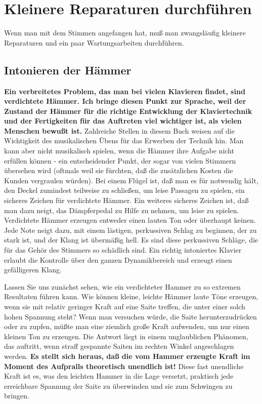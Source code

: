 
\chapter{Kleinere Reparaturen durchführen}
\label{c2_7}

Wenn man mit dem Stimmen angefangen hat, muß man zwangsläufig kleinere Reparaturen und ein paar Wartungsarbeiten durchführen.
 

\hypertarget{c2_7a}{}
\section{Intonieren der Hämmer}
\label{c2_7_hamm}

\textbf{Ein verbreitetes Problem, das man bei vielen Klavieren findet, sind verdichtete Hämmer.
Ich bringe diesen Punkt zur Sprache, weil der Zustand der Hämmer für die richtige Entwicklung der Klaviertechnik und der Fertigkeiten für das Auftreten viel wichtiger ist, als vielen Menschen bewußt ist.}
Zahlreiche Stellen in diesem Buch weisen auf die Wichtigkeit des musikalischen Übens für das Erwerben der Technik hin.
Man kann aber nicht musikalisch spielen, wenn die Hämmer ihre Aufgabe nicht erfüllen können - ein entscheidender Punkt, der sogar von vielen Stimmern übersehen wird (oftmals weil sie fürchten, daß die zusätzlichen Kosten die Kunden vergraulen würden).
Bei einem Flügel ist, daß man es für notwendig hält, den Deckel zumindest teilweise zu schließen, um leise Passagen zu spielen, ein sicheres Zeichen für verdichtete Hämmer.
Ein weiteres sicheres Zeichen ist, daß man dazu neigt, das Dämpferpedal zu Hilfe zu nehmen, um leise zu spielen.
Verdichtete Hämmer erzeugen entweder einen lauten Ton oder überhaupt keinen.
Jede Note neigt dazu, mit einem lästigen, perkussiven Schlag zu beginnen, der zu stark ist, und der Klang ist übermäßig hell.
Es sind diese perkussiven Schläge, die für das Gehör des Stimmers so schädlich sind.
Ein richtig intoniertes Klavier erlaubt die Kontrolle über den ganzen Dynamikbereich und erzeugt einen gefälligeren Klang.

Lassen Sie uns zunächst sehen, wie ein verdichteter Hammer zu so extremen Resultaten führen kann.
Wie können kleine, leichte Hämmer laute Töne erzeugen, wenn sie mit relativ geringer Kraft auf eine Saite treffen, die unter einer solch hohen Spannung steht?
Wenn man versuchen würde, die Saite herunterzudrücken oder zu zupfen, müßte man eine ziemlich große Kraft aufwenden, um nur einen kleinen Ton zu erzeugen.
Die Antwort liegt in einem unglaublichen Phänomen, das auftritt, wenn straff gespannte Saiten im rechten Winkel angeschlagen werden.
\textbf{Es stellt sich heraus, daß die vom Hammer erzeugte Kraft im Moment des Aufpralls theoretisch unendlich ist!}
Diese fast unendliche Kraft ist es, was den leichten Hammer in die Lage versetzt, praktisch jede erreichbare Spannung der Saite zu überwinden und sie zum Schwingen zu bringen.

